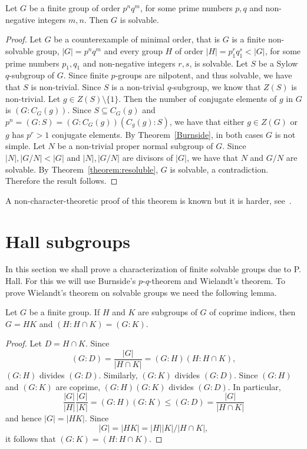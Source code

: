 \begin{theorem}
Let $G$ be a finite group of order $p^nq^m$, for some prime numbers $p,q$ and non-negative integers $m,n$. Then $G$ is solvable.
\end{theorem}

\begin{proof}
    Let $G$ be a counterexample of minimal order, that is $G$ is a finite non-solvable group, $|G|=p^nq^m$ and every group $H$ of order
    $|H|=p_1^{r}q_1^{s}<|G|$, for some prime numbers $p_1,q_1$ and non-negative integers $r,s$, is solvable.  Let $S$ be a Sylow $q$-subgroup of $G$. Since finite $p$-groups are nilpotent, and thus solvable, we have that $S$ is non-trivial. Since $S$ is a non-trivial $q$-subgroup, we know that $Z(S)$ is non-trivial. Let $g\in Z(S)\setminus\{ 1\}$. Then the number of conjugate elements of $g$ in $G$ is $(G:C_G(g))$. Since $S\subseteq C_G(g)$ and $p^n=(G:S)=(G:C_G(g))(C_g(g):S)$, we have that either $g\in Z(G)$ or $g$ has
    $p^r>1$ conjugate elements. By Theorem~\ref{Burnside}, in both cases $G$ is not simple. Let $N$ be a non-trivial proper normal subgroup of $G$. Since $|N|,|G/N|<|G|$ and $|N|,|G/N|$ are divisors of $|G|$, we have that $N$ and $G/N$ are solvable. By Theorem~\ref{theorem:resoluble}, $G$ is solvable, a contradiction. Therefore the result follows.
\end{proof}
A non-character-theoretic proof of this theorem is known but it is harder, see~\cite{MR2426855}.


\section*{Hall subgroups}

In this section we shall prove a characterization of finite solvable groups due to P. Hall. For this we will use Burnside's $p$-$q$-theorem and Wielandt's theorem.
To prove Wielandt's theorem on solvable groups 
we need the following lemma.  

\begin{lemma}
	\label{lemma:4Wielandt}
	Let $G$ be a finite group. If $H$ and $K$ are subgroups of $G$ of coprime indices, then 
    $G=HK$ and $(H:H\cap K)=(G:K)$.
\end{lemma}

\begin{proof}
	Let $D=H\cap K$. Since
	\[
	(G:D)=\frac{|G|}{|H\cap K|}=(G:H)(H:H\cap K),
	\]
	$(G:H)$ divides $(G:D)$. Similarly, $(G:K)$ divides 
	$(G:D)$. Since $(G:H)$ and $(G:K)$ are coprime, $(G:H)(G:K)$
	divides $(G:D)$. In particular, 
	\[
	\frac{|G|}{|H|}\frac{|G|}{|K|}=(G:H)(G:K)\leq (G:D)=\frac{|G|}{|H\cap K|}
	\]
	and hence $|G|=|HK|$. Since 
	\[
	|G|=|HK|=|H||K|/|H\cap K|, 
	\]
	it follows that 
	$(G:K)=(H:H\cap K)$.
\end{proof}

